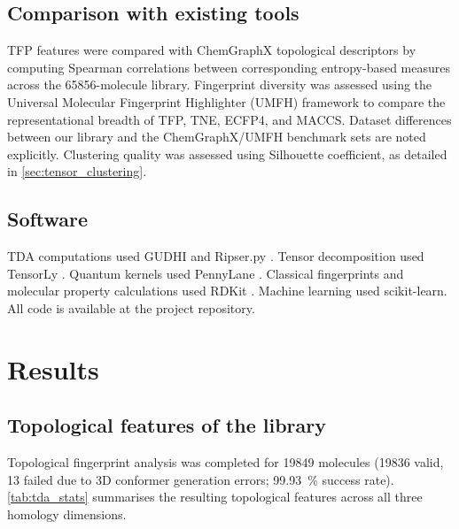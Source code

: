 \documentclass[11pt,a4paper]{article}
\begin{document}
\subsection{Comparison with existing tools}

TFP features were compared with ChemGraphX topological descriptors \citep{chemgraphx_2026} by computing Spearman correlations between corresponding entropy-based measures across the \num{65856}-molecule library. Fingerprint diversity was assessed using the Universal Molecular Fingerprint Highlighter (UMFH) framework \citep{umfh_2026} to compare the representational breadth of TFP, TNE, ECFP4, and MACCS. Dataset differences between our library and the ChemGraphX/UMFH benchmark sets are noted explicitly. Clustering quality was assessed using Silhouette coefficient, as detailed in \cref{sec:tensor_clustering}.

\subsection{Software}

TDA computations used GUDHI \citep{gudhi_2024} and Ripser.py \citep{ripser_2019}. Tensor decomposition used TensorLy \citep{tensorly_2019}. Quantum kernels used PennyLane \citep{pennylane_2024}. Classical fingerprints and molecular property calculations used RDKit \citep{rdkit_2024}. Machine learning used scikit-learn. All code is available at the project repository.


\section{Results}

\subsection{Topological features of the library}

Topological fingerprint analysis was completed for \num{19849} molecules (\num{19836} valid, 13 failed due to 3D conformer generation errors; \qty{99.93}{\percent} success rate). \cref{tab:tda_stats} summarises the resulting topological features across all three homology dimensions.
\end{document}
